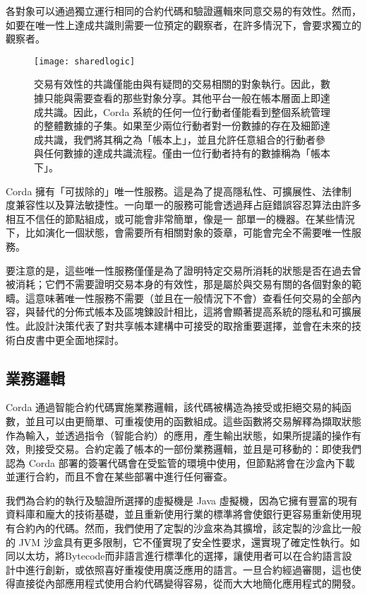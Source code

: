 \documentclass[UTF8]{ctexart}
\begin{document}
各對象可以通過獨立運行相同的合約代碼和驗證邏輯來同意交易的有效性。然而，如要在唯一性上達成共識則需要一位預定的觀察者，在許多情況下，會要求獨立的觀察者。

\begin{figure}[H]
    \texttt{[image: sharedlogic]}
    \caption{交易有效性的共識僅能由與有疑問的交易相關的對象執行。因此，數據只能與需要查看的那些對象分享。其他平台一般在帳本層面上即達成共識。因此，Corda 系統的任何一位行動者僅能看到整個系統管理的整體數據的子集。如果至少兩位行動者對一份數據的存在及細節達成共識，我們將其稱之為「帳本上」，並且允許任意組合的行動者參與任何數據的達成共識流程。僅由一位行動者持有的數據稱為「帳本下」。}
\end{figure}

Corda 擁有「可拔除的」唯一性服務。這是為了提高隱私性、可擴展性、法律制度兼容性\cite{EUC}以及算法敏捷性。一向單一的服務可能會透過拜占庭錯誤容忍算法由許多相互不信任的節點組成，或可能會非常簡單，像是一 部單一的機器。在某些情況下，比如演化一個狀態，會需要所有相關對象的簽章，可能會完全不需要唯一性服務。 

要注意的是，這些唯一性服務僅僅是為了證明特定交易所消耗的狀態是否在過去曾被消耗；它們不需要證明交易本身的有效性，那是屬於與交易有關的各個對象的範疇。這意味著唯一性服務不需要（並且在一般情況下不會）查看任何交易的全部內容，與替代的分佈式帳本及區塊鍊設計相比，這將會顯著提高系統的隱私和可擴展性。此設計決策代表了對共享帳本建構中可接受的取捨重要選擇，並會在未來的技術白皮書中更全面地探討。

\subsection{業務邏輯}
Corda 通過智能合約代碼實施業務邏輯，該代碼被構造為接受或拒絕交易的純函數，並且可以由更簡單、可重複使用的函數組成。這些函數將交易解釋為擷取狀態作為輸入，並透過指令（智能合約）的應用，產生輸出狀態，如果所提議的操作有效，則接受交易。合約定義了帳本的一部份業務邏輯，並且是可移動的：即使我們認為 Corda 部署的簽署代碼會在受監管的環境中使用，但節點將會在沙盒內下載並運行合約，而且不會在某些部署中進行任何審查。 

我們為合約的執行及驗證所選擇的虛擬機是 Java 虛擬機\cite{JVM}，因為它擁有豐富的現有資料庫和龐大的技術基礎，並且重新使用行業的標準將會使銀行更容易重新使用現有合約內的代碼。然而，我們使用了定製的沙盒來為其擴增，該定製的沙盒比一般的 JVM 沙盒具有更多限制，它不僅實現了安全性要求，還實現了確定性執行。如同以太坊\cite{以太坊}，將Bytecode而非語言進行標準化的選擇，讓使用者可以在合約語言設計中進行創新，或依照喜好重複使用廣泛應用的語言。一旦合約經過審閱，這也使得直接從內部應用程式使用合約代碼變得容易，從而大大地簡化應用程式的開發。
\end{document}
